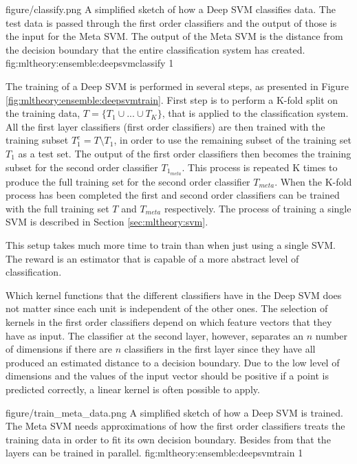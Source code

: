 \singlefigure
{figure/classify.png}
{A simplified sketch of how a Deep SVM classifies data. The test data is passed through the first order classifiers and the output of those is the input for the Meta SVM. The output of the Meta SVM is the distance from the decision boundary that the entire classification system has created.}
{fig:mltheory:ensemble:deepsvmclassify}
{1}

The training of a Deep SVM is performed in several steps, as presented in Figure \ref{fig:mltheory:ensemble:deepsvmtrain}. First step is to perform a K-fold split on the training data, $T=\{T_1\cup...\cup T_K\}$, that is applied to the classification system. All the first layer classifiers (first order classifiers) are then trained with the training subset $T_1^c=T\setminus T_1$, in order to use the remaining subset of the training set $T_1$ as a test set. The output of the first order classifiers then becomes the training subset for the second order classifier $T_{1_{meta}}$. This process is repeated K times to produce the full training set for the second order classifier $T_{meta}$. When the K-fold process has been completed the first and second order classifiers can be trained with the full training set $T$ and $T_{meta}$ respectively. The process of training a single SVM is described in Section \ref{sec:mltheory:svm}.  

This setup takes much more time to train than when just using a single SVM. The reward is an estimator that is capable of a more abstract level of classification.

Which kernel functions that the different classifiers have in the Deep SVM does not matter since each unit is independent of the other ones. The selection of kernels in the first order classifiers depend on which feature vectors that they have as input. The classifier at the second layer, however, separates an $n$ number of dimensions if there are $n$ classifiers in the first layer since they have all produced an estimated distance to a decision boundary. Due to the low level of dimensions and the values of the input vector should be positive if a point is predicted correctly, a linear kernel is often possible to apply.

\singlefigure
{figure/train_meta_data.png}
{A simplified sketch of how a Deep SVM is trained. The Meta SVM needs approximations of how the first order classifiers treats the training data in order to fit its own decision boundary. Besides from that the layers can be trained in parallel.}
{fig:mltheory:ensemble:deepsvmtrain}
{1}
